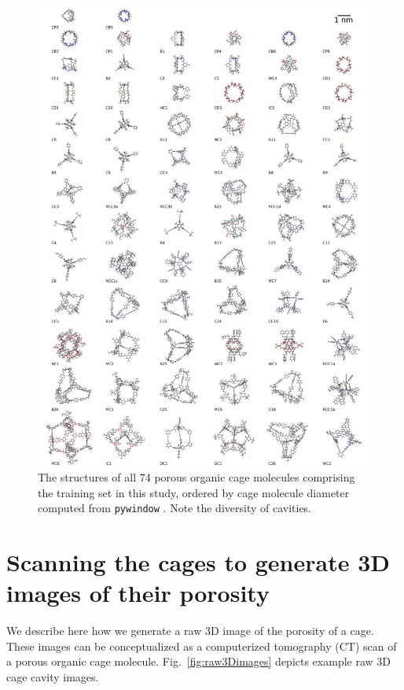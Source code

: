 \documentclass[journal=jacsat,manuscript=article,layout=traditional]{achemso}
\begin{document}
\begin{figure}
\centering
	\includegraphics[width=0.9\columnwidth]{../all_cages/grid_of_cages_labeled.pdf} %
	\caption{The structures of all 74 porous organic cage molecules \cite{miklitz2017computational,greenaway2018high} comprising the training set in this study, ordered by cage molecule diameter computed from \texttt{pywindow} \cite{miklitz2018pywindow}. Note the diversity of cavities.
	} \label{fig:cages}
\end{figure}

\section{Scanning the cages to generate 3D images of their porosity} We describe here how we generate a raw 3D image of the porosity of a cage. These images can be conceptualized as a computerized tomography (CT) scan of a porous organic cage molecule. Fig.~\ref{fig:raw3Dimages} depicts example raw 3D cage cavity images.
\end{document}
